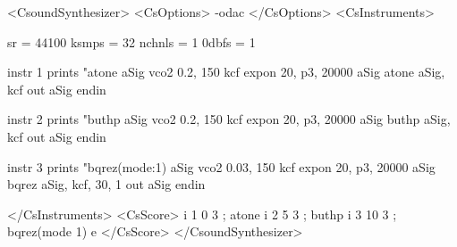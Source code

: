 <CsoundSynthesizer>
<CsOptions>
-odac 
</CsOptions>
<CsInstruments>

sr = 44100
ksmps = 32
nchnls = 1
0dbfs = 1

  instr 1
        prints       "atone%
aSig    vco2         0.2, 150      
kcf     expon        20, p3, 20000 
aSig    atone        aSig, kcf     
        out          aSig         
  endin

  instr 2
        prints       "buthp%
aSig    vco2         0.2, 150     
kcf     expon        20, p3, 20000
aSig    buthp        aSig, kcf    
        out          aSig       
  endin

  instr 3
        prints       "bqrez(mode:1)%
aSig    vco2         0.03, 150        
kcf     expon        20, p3, 20000    
aSig    bqrez        aSig, kcf, 30, 1 
        out          aSig         
  endin

</CsInstruments>
<CsScore>
i 1 0  3 ; atone
i 2 5  3 ; buthp
i 3 10 3 ; bqrez(mode 1)
e
</CsScore>
</CsoundSynthesizer>